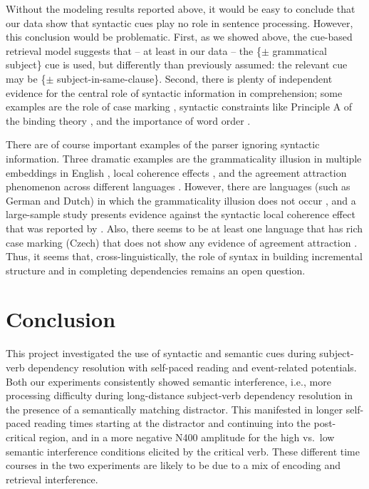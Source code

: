 \documentclass[a4paper, man, floatsintext]{apa7}
\begin{document}
Without the modeling results reported above, it would be easy to conclude that our data show that syntactic cues play no role in sentence processing. However, this conclusion would be problematic. First, as we showed above, the cue-based retrieval model suggests that -- at least in our data -- the \{$\pm$ grammatical subject\} cue is used, but differently than previously assumed: the relevant cue may be \{$\pm$ subject-in-same-clause\}. Second, there is plenty of independent evidence for the central role of syntactic information in comprehension; some examples are the role of case marking \parencite[e.g.,][]{ALV2019,HusainEtAl2014,bhatia2022processing,bader2000case,bader2006case,miyamoto2002case}, syntactic constraints like Principle A of the binding theory \parencite[e.g.,][]{Sturt2003,dillon2013,yadav2021individual},  and 
the importance of word order \parencite[e.g.,][]{meng2000mode}. 

There are of course important examples of the parser ignoring syntactic information. Three dramatic examples are the grammaticality illusion in multiple embeddings in English \parencite{gibsonthomas99}, local coherence effects \parencite{taboretal04}, and the agreement attraction phenomenon across different languages \parencite{wagersetal,lago_etal_2021,jaeger_etal_2017}.  However, there are languages (such as German and Dutch) in which the grammaticality illusion does not occur \parencite{VSLK11,FrankEtAl2015}, and a large-sample study \parencite{lcpaape2023} presents evidence against the syntactic local coherence effect that was reported by \textcite{taboretal04}. Also, there seems to be at least one language that has rich case marking (Czech) that does not show any evidence of agreement attraction \parencite{chromy2023number}. Thus, it seems that, cross-linguistically, the role of syntax in building incremental structure and in completing dependencies remains an open question.

\section{Conclusion}
This project investigated the use of  syntactic and semantic cues during subject-verb dependency resolution with self-paced reading and event-related potentials.  Both our experiments consistently showed semantic interference, i.e., more processing difficulty during long-distance subject-verb dependency resolution in the presence of a semantically matching distractor. This manifested in longer self-paced reading times starting at the distractor and continuing into the post-critical region, and in a more negative N400 amplitude for the high vs.\ low semantic interference conditions elicited by the critical verb. These different time courses in the two experiments are likely to be due to a mix of encoding and retrieval interference. 
 
\end{document}
